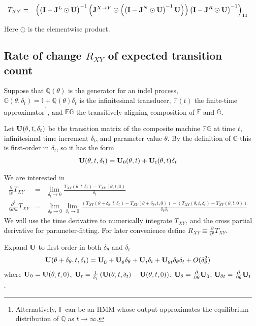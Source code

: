 \documentclass{article}
\begin{document}
\begin{eqnarray*}
T_{XY} & = &
\left(
\left( {\bf I} - {\bf J}^L \odot {\bf U} \right)^{-1}
\left(
     {\bf J}^{X \to Y} \odot
     \left(
     \left( {\bf I} - {\bf J}^N \odot {\bf U} \right)^{-1}
          {\bf U}
     \right)
\right)
\left( {\bf I} - {\bf J}^R \odot {\bf U} \right)^{-1}
\right)_{11}
\end{eqnarray*}

Here $\odot$ is the elementwise product.



\subsection{Rate of change $R_{XY}$ of expected transition count}

Suppose that
$\mathbb{Q}(\theta)$ is the generator for an indel process,
$\mathbb{G}(\theta,\delta_t) = \mathbb{I} + \mathbb{Q}(\theta) \delta_t$ is the infinitesimal transducer,
$\mathbb{F}(t)$ the finite-time approximator\footnote{Alternatively, $\mathbb{F}$ can be an HMM whose output approximates the equilibrium distribution of $\mathbb{Q}$ as $t \to \infty$.},
and $\mathbb{FG}$ the transitively-aligning composition of $\mathbb{F}$ and $\mathbb{G}$.

Let ${\bf U}(\theta,t,\delta_t)$ be the transition matrix
of the composite machine $\mathbb{FG}$
at time $t$, infinitesimal time increment $\delta_t$, and parameter value $\theta$.
By the definition of $\mathbb{G}$ this is first-order in $\delta_t$, so it has the form
\[
  {\bf U}(\theta,t,\delta_t) = {\bf U}_0(\theta,t) + {\bf U}_t(\theta,t) \delta_t
  \]

We are interested in
\begin{eqnarray*}
\frac{\partial}{\partial t}T_{XY} & = & \lim_{\delta_t \to 0} \frac{T_{XY}(\theta,t,\delta_t) - T_{XY}(\theta,t,0)}{\delta_t} \\
\frac{\partial^2}{\partial \theta \partial t}T_{XY} & = & \lim_{\delta_\theta \to 0} \lim_{\delta_t \to 0}
\frac{\left(T_{XY}(\theta+\delta_\theta,t,\delta_t) - T_{XY}(\theta+\delta_\theta,t,0)\right) - \left(T_{XY}(\theta,t,\delta_t) - T_{XY}(\theta,t,0)\right)}{\delta_\theta \delta_t}
\end{eqnarray*}
We will use the time derivative to numerically integrate $T_{XY}$, and the cross partial derivative for parameter-fitting.
For later convenience define $R_{XY} \equiv \frac{\partial}{\partial t} T_{XY}$.

Expand ${\bf U}$ to first order in both $\delta_\theta$ and $\delta_t$
\newcommand\tthetaexpansion[2]{  {#2}_0^{#1}
  + {#2}_\theta^{#1} \delta_\theta
  + {#2}_t^{#1} \delta_t
  + {#2}_{\theta t}^{#1} \delta_\theta \delta_t }
\newcommand\uexpansion{\tthetaexpansion{}{\bf U}}
\newcommand\vexpansion[1]{\tthetaexpansion{#1}{\bf V}}
\[
  {\bf U}(\theta+\delta_\theta,t,\delta_t) = \uexpansion + O(\delta_\theta^2) %
\]
where ${\bf U}_0={\bf U}(\theta,t,0)$,
${\bf U}_t=\frac{1}{\delta_t} \left( {\bf U}(\theta,t,\delta_t) - {\bf U}(\theta,t,0) \right)$,
${\bf U}_\theta=\frac{\partial}{\partial \theta} {\bf U}_0$,
${\bf U}_{\theta t}=\frac{\partial}{\partial \theta}  {\bf U}_t$.
\end{document}
